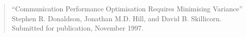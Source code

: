 \documentclass[12pt]{report}
\begin{document}
\begin{quote}
``Communication Performance Optimisation Requires Minimising
     Variance'' Stephen R.  Donaldson, Jonathan M.D. Hill, and David
     B. Skillicorn. Submitted for publication, November 1997.
\end{quote}

        
	
	
	

	
	
        
	

	
	
	

	
	
	




\printindex
\end{document}
